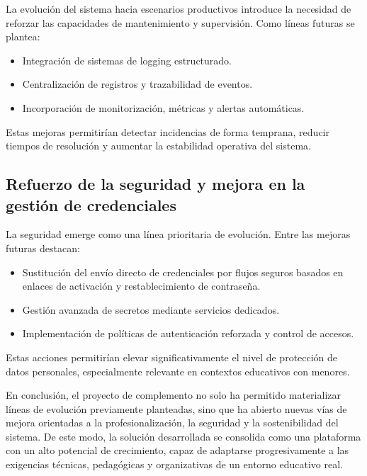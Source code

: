 La evolución del sistema hacia escenarios productivos introduce la necesidad de reforzar las capacidades de mantenimiento y supervisión. Como líneas futuras se plantea:

\begin{itemize}
    \item Integración de sistemas de logging estructurado.
    \item Centralización de registros y trazabilidad de eventos.
    \item Incorporación de monitorización, métricas y alertas automáticas.
\end{itemize}

Estas mejoras permitirían detectar incidencias de forma temprana, reducir tiempos de resolución y aumentar la estabilidad operativa del sistema.

\subsection{Refuerzo de la seguridad y mejora en la gestión de credenciales}

La seguridad emerge como una línea prioritaria de evolución. Entre las mejoras futuras destacan:

\begin{itemize}
    \item Sustitución del envío directo de credenciales por flujos seguros basados en enlaces de activación y restablecimiento de contraseña.
    \item Gestión avanzada de secretos mediante servicios dedicados.
    \item Implementación de políticas de autenticación reforzada y control de accesos.
\end{itemize}

Estas acciones permitirían elevar significativamente el nivel de protección de datos personales, especialmente relevante en contextos educativos con menores.

En conclusión, el proyecto de complemento no solo ha permitido materializar líneas de evolución previamente planteadas, sino que ha abierto nuevas vías de mejora orientadas a la profesionalización, la seguridad y la sostenibilidad del sistema. De este modo, la solución desarrollada se consolida como una plataforma con un alto potencial de crecimiento, capaz de adaptarse progresivamente a las exigencias técnicas, pedagógicas y organizativas de un entorno educativo real.
